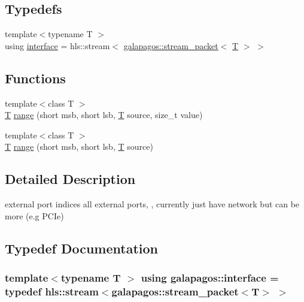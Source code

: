 \subsection*{Typedefs}
\begin{DoxyCompactItemize}
\item 
{\footnotesize template$<$typename T $>$ }\\using \hyperlink{namespacegalapagos_a151d65e2506da0745201fb1dae77b740}{interface} = hls\+::stream$<$ \hyperlink{structgalapagos_1_1stream__packet}{galapagos\+::stream\+\_\+packet}$<$ \hyperlink{test_8cpp_a0658ceffa730c765d449bb3d21871b5f}{T} $>$ $>$
\end{DoxyCompactItemize}
\subsection*{Functions}
\begin{DoxyCompactItemize}
\item 
{\footnotesize template$<$class T $>$ }\\\hyperlink{test_8cpp_a0658ceffa730c765d449bb3d21871b5f}{T} \hyperlink{namespacegalapagos_a7b825b7d39b5187a8f617fbdd414c747}{range} (short msb, short lsb, \hyperlink{test_8cpp_a0658ceffa730c765d449bb3d21871b5f}{T} source, size\+\_\+t value)
\item 
{\footnotesize template$<$class T $>$ }\\\hyperlink{test_8cpp_a0658ceffa730c765d449bb3d21871b5f}{T} \hyperlink{namespacegalapagos_adf747977be6d582c3a8b1c38b531c06d}{range} (short msb, short lsb, \hyperlink{test_8cpp_a0658ceffa730c765d449bb3d21871b5f}{T} source)
\end{DoxyCompactItemize}


\subsection{Detailed Description}
external port indices all external ports, , currently just have network but can be more (e.\+g P\+C\+Ie) 

\subsection{Typedef Documentation}
\subsubsection[{\texorpdfstring{interface}{interface}}]{\setlength{\rightskip}{0pt plus 5cm}template$<$typename T $>$ using {\bf galapagos\+::interface} = typedef hls\+::stream$<${\bf galapagos\+::stream\+\_\+packet}$<${\bf T}$>$ $>$}\hypertarget{namespacegalapagos_a151d65e2506da0745201fb1dae77b740}{}\label{namespacegalapagos_a151d65e2506da0745201fb1dae77b740}


